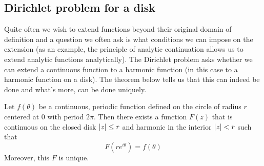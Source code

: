 \subsection{Dirichlet problem for a disk}
Quite often we wish to extend functions beyond their original domain of definition and a question we often ask is what conditions we can impose on the extension (as an example, the principle of analytic continuation allows us to extend analytic functions analytically). The Dirichlet problem asks whether we can extend a continuous function to a harmonic function (in this case to a harmonic function on a disk). The theorem below tells us that this can indeed be done and what's more, can be done uniquely.
\begin{theorem}
Let $f(\theta)$ be a continuous, periodic function defined on the circle of radius $r$ centered at 0 with period $2\pi$. Then there exists a function $F(z)$ that is continuous on the closed disk $\left|z\right| \leq r$ and harmonic in the interior $\left|z\right| < r$ such that
$$F(r e^{i\theta}) = f(\theta)$$
Moreover, this $F$ is unique.
\end{theorem}
